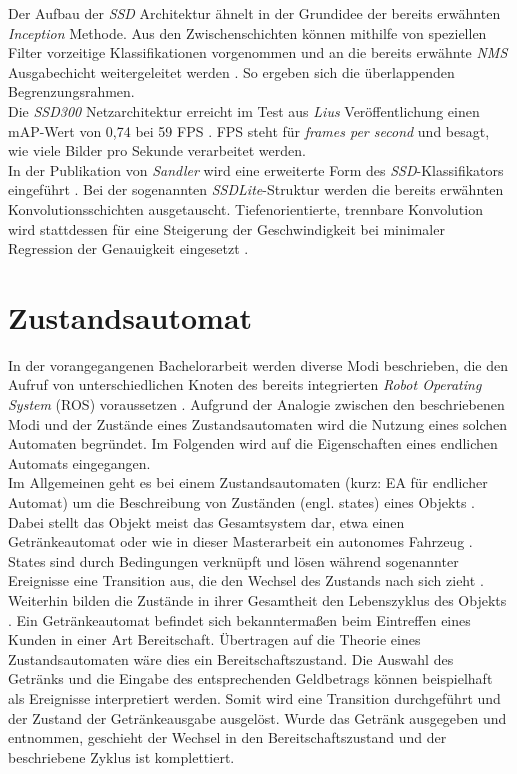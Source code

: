 		Der Aufbau der \textit{SSD} Architektur ähnelt in der Grundidee der bereits erwähnten \textit{Inception} Methode. Aus den Zwischenschichten können mithilfe von speziellen Filter vorzeitige Klassifikationen vorgenommen und an die bereits erwähnte \textit{NMS} Ausgabechicht weitergeleitet werden \cite{ssd}. So ergeben sich die überlappenden Begrenzungsrahmen.\\
		
		Die \textit{SSD300} Netzarchitektur erreicht im  Test aus \textit{Lius} Veröffentlichung einen mAP-Wert von 0,74 bei 59 FPS \cite{ssd}. FPS steht für \textit{frames per second} und besagt, wie viele Bilder pro Sekunde verarbeitet werden.\\
		
		In der Publikation von \textit{Sandler} wird eine erweiterte Form des \textit{SSD}-Klassifikators eingeführt \cite{mobilenetv2}. Bei der sogenannten \textit{SSDLite}-Struktur werden die bereits erwähnten Konvolutionsschichten ausgetauscht. Tiefenorientierte, trennbare Konvolution wird stattdessen für eine Steigerung der Geschwindigkeit bei minimaler Regression der Genauigkeit eingesetzt \cite{mobilenetv2}.     		
		
		
		
		  			
	

			
	\section{Zustandsautomat}
	\label{sec: Zustandautomat}
	In der vorangegangenen Bachelorarbeit werden diverse Modi beschrieben, die den Aufruf von unterschiedlichen Knoten des bereits integrierten \textit{Robot Operating System} (ROS) voraussetzen \cite{Bachelorarbeit}. Aufgrund der Analogie zwischen den beschriebenen Modi und der Zustände eines Zustandsautomaten wird die Nutzung eines solchen Automaten begründet. Im Folgenden wird auf die Eigenschaften eines endlichen Automats eingegangen.\\
	
	Im Allgemeinen geht es bei einem Zustandsautomaten (kurz: EA für endlicher Automat) um die Beschreibung von Zuständen (engl. states) eines Objekts \cite{uml}. Dabei stellt das Objekt meist das Gesamtsystem dar, etwa einen Getränkeautomat oder wie in dieser Masterarbeit ein autonomes Fahrzeug \cite{uml}. States sind durch Bedingungen verknüpft und lösen während sogenannter Ereignisse eine Transition aus, die den Wechsel des Zustands nach sich zieht \cite{uml}. Weiterhin bilden die Zustände in ihrer Gesamtheit den Lebenszyklus des Objekts \cite{uml}. Ein Getränkeautomat befindet sich bekanntermaßen beim Eintreffen eines Kunden in einer Art Bereitschaft. Übertragen auf die Theorie eines Zustandsautomaten wäre dies ein Bereitschaftszustand. Die Auswahl des Getränks und die Eingabe des entsprechenden Geldbetrags können beispielhaft als Ereignisse interpretiert werden. Somit wird eine Transition durchgeführt und der Zustand der Getränkeausgabe ausgelöst. Wurde das Getränk ausgegeben und entnommen, geschieht der Wechsel in den Bereitschaftszustand und der beschriebene Zyklus ist komplettiert.\\
	
